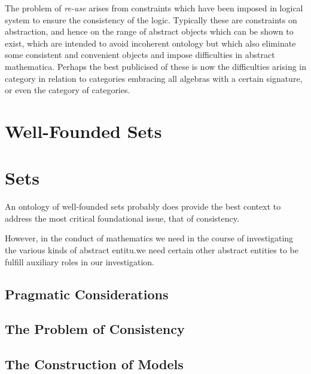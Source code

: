 \documentclass[numreferences]{book}
\begin{document}
The problem of \emph{re-use} arises from constraints which have been imposed in logical system to ensure the consistency of the logic.
Typically these are constraints on abstraction, and hence on the range of abstract objects which can be shown to exist, which are intended to avoid incoherent ontology but which also eliminate some consistent and convenient objects and impose difficulties in abstract mathematica.
Perhaps the best publicised of these is now the difficulties arising in category in relation to categories embracing all algebras with a certain signature, or even the category of categories.


\section{Well-Founded Sets}

\section{Sets}

An ontology of well-founded sets probably does provide the best context to address the most critical foundational issue, that of consistency.

However, in the conduct of mathematics we need in the course of investigating the various kinds of abstract entitu.we need certain other abstract entities to be fulfill auxiliary roles in our investigation.


\subsection{Pragmatic Considerations}

\subsection{The Problem of Consistency}

\subsection{The Construction of Models} 

\backmatter
%
%

\label{index}
{\twocolumn[]
{\small\printindex}}
\end{document}
